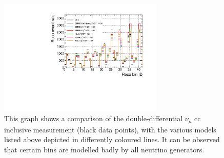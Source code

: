 \begin{figure}[htbp]
  \centering
  \includegraphics[width=0.7\textwidth]{images/NewCCInclusive/xsec/data_generator_comparison_chi2NDF.pdf}
  \caption[Multiple Model Comparison]{This graph shows a comparison of the double-differential $\nu_\mu$ \gls{cc} inclusive measurement (black data points), with the various models listed above depicted in differently coloured lines. It can be observed that certain bins are modelled badly by all neutrino generators.}
  \label{fig:data_model}
\end{figure}

